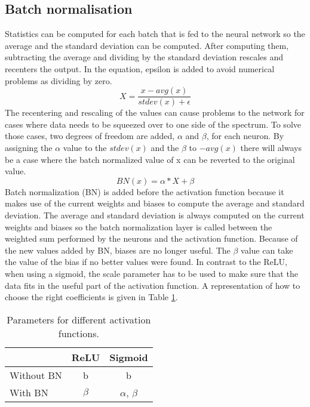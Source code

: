 \subsection{Batch normalisation}
Statistics can be computed for each batch that is fed to the neural network so the average and the standard deviation can be computed. After computing them, subtracting the average and dividing by the standard deviation rescales and recenters the output. 
In the equation, epsilon is added to avoid numerical problems as dividing by zero.
\begin{equation}
    X= \dfrac{x - avg(x)}{stdev(x) + \epsilon} 
\end{equation}
The recentering and rescaling of the values can cause problems to
the network for cases where data needs to be squeezed over 
to one side of the spectrum.
To solve those cases, two degrees of freedom are added, 
$\alpha$ and $\beta$, for each neuron. 
By assigning the $\alpha$ value to the $stdev(x)$ and the
$\beta$ to $-avg(x)$ there will always be a case where the batch
normalized value of x can be reverted to the original value.
\begin{equation}
    BN(x) = \alpha * X + \beta
\end{equation}
Batch normalization (BN) is added before the activation function
because it makes use of the current weights and biases to
compute the average and standard deviation. 
The average and standard deviation is always computed on the
current weights and biases so the batch normalization layer is
called between the weighted sum performed by the neurons and the
activation function. Because of the new values added by BN,
biases are no longer useful.
The $\beta$ value can take the value of the bias if no better
values were found.
In contrast to the ReLU, when using a sigmoid,
the scale parameter has to be used to make sure that
the data fits in the useful part of the activation function.
A representation of how to choose the right coefficients is
given in Table \ref{tab:Parameters}.
\begin{table}[htbp]
\centering
    \caption{Parameters for different activation functions.}
    \begin{tabular}{l c c}
    \toprule
          & ReLU & Sigmoid \\\midrule
        Without BN &b & b  \\
        With BN & $\beta$ & $\alpha$, $\beta$  \\
    \bottomrule
    \end{tabular}
\label{tab:Parameters}
\end{table}

